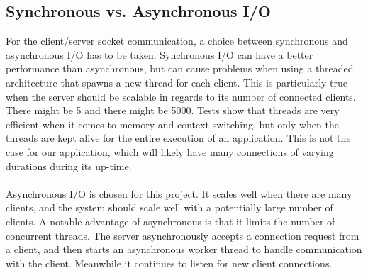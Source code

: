 \subsection{Synchronous vs. Asynchronous I/O}
For the client/server socket communication, a choice between synchronous and asynchronous I/O has to be taken.
Synchronous I/O can have a better performance than asynchronous, but can cause problems when using a threaded architecture that spawns a new thread for each client. This is particularly true when the server should be scalable in regards to its number of connected clients. There might be 5 and there might be 5000.
Tests show that threads are very efficient when it comes to memory and context switching, but only when the threads are kept alive for the entire execution of an application. This is not the case for our application, which will likely have many connections of varying durations during its up-time. \\\\
Asynchronous I/O is chosen for this project. It scales well when there are many clients, and the system should scale well with a potentially large number of clients. A notable advantage of asynchronous is that it limits the number of concurrent threads. The server asynchronously accepts a connection request from a client, and then starts an asynchronous worker thread to handle communication with the client. Meanwhile it continues to listen for new client connections.


